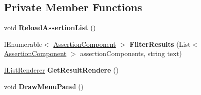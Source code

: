 \subsection*{Private Member Functions}
\begin{DoxyCompactItemize}
\item 
\mbox{\label{class_unity_test_1_1_assertion_explorer_window_a3408c7a0e2bb66251669a8adf3f29d45}} 
void {\bfseries Reload\+Assertion\+List} ()
\item 
\mbox{\label{class_unity_test_1_1_assertion_explorer_window_ac6e8f7ecd22a6b2b9c5143221ffde17f}} 
I\+Enumerable$<$ \hyperlink{class_unity_test_1_1_assertion_component}{Assertion\+Component} $>$ {\bfseries Filter\+Results} (List$<$ \hyperlink{class_unity_test_1_1_assertion_component}{Assertion\+Component} $>$ assertion\+Components, string text)
\item 
\mbox{\label{class_unity_test_1_1_assertion_explorer_window_a79618f0b373db36c6eca5bf0f991aefa}} 
\hyperlink{interface_unity_test_1_1_i_list_renderer}{I\+List\+Renderer} {\bfseries Get\+Result\+Rendere} ()
\item 
\mbox{\label{class_unity_test_1_1_assertion_explorer_window_a97f6a31c0f8c28d871e0b65ae02673c0}} 
void {\bfseries Draw\+Menu\+Panel} ()
\end{DoxyCompactItemize}
